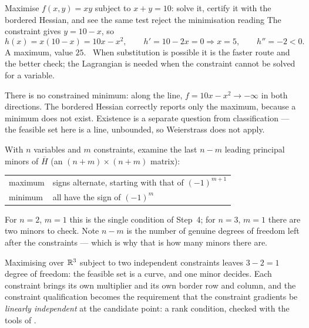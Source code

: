 \begin{worked}{Maximise $f(x,y)=xy$ subject to $x+y=10$: solve it, certify it with the bordered Hessian, and see the same test reject the minimisation reading}
The constraint gives $y=10-x$, so
\[
  h(x)=x(10-x)=10x-x^{2},
  \qquad
  h'=10-2x=0\Rightarrow x=5,
  \qquad
  h''=-2<0 .
\]
A maximum, value $25$. \checkmark\ When substitution is possible it is the
faster route and the better check; the Lagrangian is needed when the
constraint cannot be solved for a variable.

There is no constrained minimum: along the line, $f=10x-x^{2}\to-\infty$ in
both directions. The bordered Hessian correctly reports only the maximum,
because a minimum does not exist. Existence is a separate question from
classification --- the feasible set here is a line, unbounded, so
Weierstrass does not apply.

With $n$ variables and $m$ constraints, examine the last $n-m$ leading
principal minors of $\overline H$ (an $(n+m)\times(n+m)$ matrix):
\begin{center}\footnotesize
\begin{tabular}{ll}
  \hline
  maximum & signs alternate, starting with that of $(-1)^{m+1}$\\
  minimum & all have the sign of $(-1)^{m}$\\
  \hline
\end{tabular}
\end{center}
For $n=2$, $m=1$ this is the single condition of Step~4; for $n=3$, $m=1$
there are two minors to check. Note $n-m$ is the number of genuine degrees
of freedom left after the constraints --- which is why that is how many
minors there are.

Maximising over $\mathbb{R}^{3}$ subject to two independent constraints leaves
$3-2=1$ degree of freedom: the feasible set is a curve, and one minor
decides. Each constraint brings its own multiplier and its own border row
and column, and the constraint qualification becomes the requirement that
the constraint gradients be \emph{linearly independent} at the candidate
point: a rank condition, checked with the tools of .
\end{worked}


